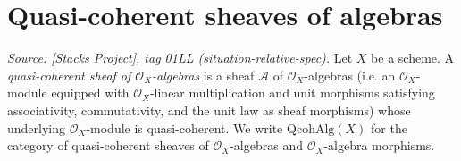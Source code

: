 \section{Quasi-coherent sheaves of algebras}
\label{sec:qc_sheaf_of_algebras}

\begin{definition}
  \label{def:qc_sheaf_of_algebras}
  \textit{Source: [Stacks Project], tag 01LL (situation-relative-spec).}
  Let \(X\) be a scheme. A \emph{quasi-coherent sheaf of \(\mathcal{O}_X\)-algebras} is a
  sheaf \(\mathcal{A}\) of \(\mathcal{O}_X\)-algebras (i.e. an \(\mathcal{O}_X\)-module
  equipped with \(\mathcal{O}_X\)-linear multiplication and unit morphisms satisfying
  associativity, commutativity, and the unit law as sheaf morphisms) whose underlying
  \(\mathcal{O}_X\)-module is quasi-coherent. We write \(\mathrm{QcohAlg}(X)\) for the
  category of quasi-coherent sheaves of \(\mathcal{O}_X\)-algebras and
  \(\mathcal{O}_X\)-algebra morphisms.
\end{definition}


